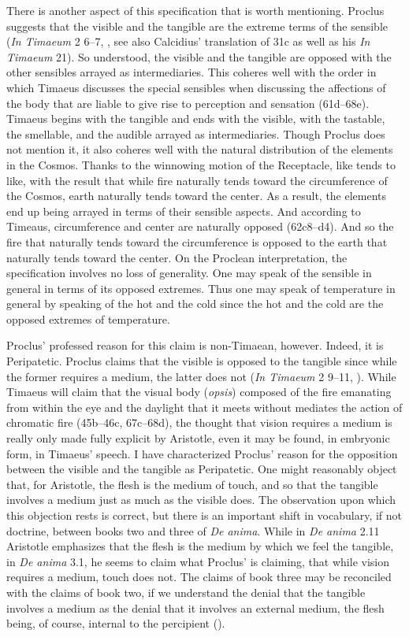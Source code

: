 There is another aspect of this specification that is worth mentioning. Proclus suggests that the visible and the tangible are the extreme terms of the sensible (\emph{In Timaeum} 2 6--7, \citealt{Diehl:1903re}, see also Calcidius' translation of 31c as well as his \emph{In Timaeum} 21). So understood, the visible and the tangible are opposed with the other sensibles arrayed as intermediaries. This coheres well with the order in which Timaeus discusses the special sensibles when discussing the affections of the body that are liable to give rise to perception and sensation (61d--68e). Timaeus begins with the tangible and ends with the visible, with the tastable, the smellable, and the audible arrayed as intermediaries. Though Proclus does not mention it, it also coheres well with the natural distribution of the elements in the Cosmos. Thanks to the winnowing motion of the Receptacle, like tends to like, with the result that while fire naturally tends toward the circumference of the Cosmos, earth naturally tends toward the center. As a result, the elements end up being arrayed in terms of their sensible aspects. And according to Timeaus, circumference and center are naturally opposed (62c8–d4). And so the fire that naturally tends toward the circumference is opposed to the earth that naturally tends toward the center. On the Proclean interpretation, the specification involves no loss of generality. One may speak of the sensible in general in terms of its opposed extremes. Thus one may speak of temperature in general by speaking of the hot and the cold since the hot and the cold are the opposed extremes of temperature.

Proclus' professed reason for this claim is non-Timaean, however. Indeed, it is Peripatetic. Proclus claims that the visible is opposed to the tangible since while the former requires a medium, the latter does not (\emph{In Timaeum} 2 9--11, \citealt{Diehl:1903re}). While Timaeus will claim that the visual body (\emph{opsis}) composed of the fire emanating from within the eye and the daylight that it meets without mediates the action of chromatic fire (45b--46c, 67c--68d), the thought that vision requires a medium is really only made fully explicit by Aristotle, even it may be found, in embryonic form, in Timaeus' speech. I have characterized Proclus' reason for the opposition between the visible and the tangible as Peripatetic. One might reasonably object that, for Aristotle, the flesh is the medium of touch, and so that the tangible involves a medium just as much as the visible does. The observation upon which this objection rests is correct, but there is an important shift in vocabulary, if not doctrine, between books two and three of \emph{De anima}. While in \emph{De anima} 2.11 Aristotle emphasizes that the flesh is the medium by which we feel the tangible, in \emph{De anima} 3.1, he seems to claim what Proclus' is claiming, that while vision requires a medium, touch does not. The claims of book three may be reconciled with the claims of book two, if we understand the denial that the tangible involves a medium as the denial that it involves an external medium, the flesh being, of course, internal to the percipient (\citealt[chapter 2.1.3]{Kalderon:2015fr}). 

